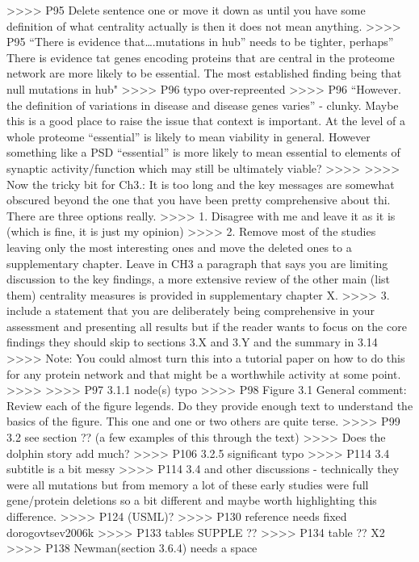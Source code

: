 >>>> P95 Delete sentence one or move it down as until you have some definition of what centrality actually is then it does not mean anything.
>>>> P95 “There is evidence that….mutations in hub” needs to be tighter, perhaps” There is evidence tat genes encoding proteins that are central in the proteome network are more likely to be essential. The most established finding being that null mutations in hub"
>>>> P96 typo over-repreented
>>>> P96 “However. the definition of variations in disease and disease genes varies” - clunky. Maybe this is a good place to raise the issue that context is important. At the level of a whole proteome “essential” is likely to mean viability in general. However something like a PSD “essential” is more likely to mean essential to elements of synaptic activity/function which may still be ultimately viable?
>>>>
>>>> Now the tricky bit for Ch3.: It is too long and the key messages are somewhat obscured beyond the one that you have been pretty comprehensive about thi. There are three options really.
>>>> 1. Disagree with me and leave it as it is (which is fine, it is just my opinion)
>>>> 2. Remove most of the studies leaving only the most interesting ones and move the deleted ones to a supplementary chapter. Leave in CH3 a paragraph that says you are limiting discussion to the key findings, a more extensive review of the other main (list them) centrality measures is provided in supplementary chapter X.
>>>> 3. include a statement that you are deliberately being comprehensive in your assessment and presenting all results but if the reader wants to focus on the core findings they should skip to sections 3.X and 3.Y and the summary in 3.14
>>>> Note: You could almost turn this into a tutorial paper on how to do this for any protein network and that might be a worthwhile activity at some point.
>>>>
>>>> P97 3.1.1 node(s) typo
>>>> P98 Figure 3.1 General comment: Review each of the figure legends. Do they provide enough text to understand the basics of the figure. This one and one or two others are quite terse.
>>>> P99 3.2 see section ??  (a few examples of this through the text)
>>>> Does the dolphin story add much?
>>>> P106 3.2.5 significant typo
>>>> P114 3.4 subtitle is a bit messy
>>>> P114 3.4 and other discussions - technically they were all mutations but from memory a lot of these early studies were full gene/protein deletions so a bit different and maybe worth highlighting this difference.
>>>> P124 (USML)?
>>>> P130 reference needs fixed dorogovtsev2006k
>>>> P133 tables SUPPLE ??
>>>> P134 table ?? X2
>>>> P138 Newman(section 3.6.4) needs a space
